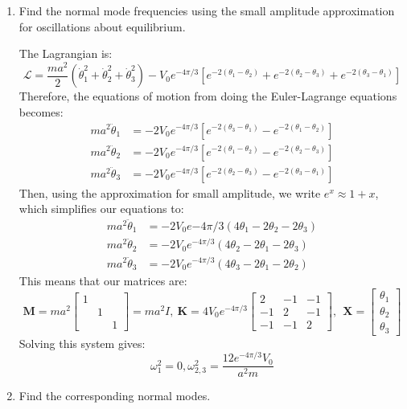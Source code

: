 \documentclass[10pt]{article}
\begin{document}
	\begin{enumerate}[label=\alph*)]
		\item Find the normal mode frequencies using the small amplitude approximation for oscillations about 
			equilibrium. 

			\begin{solution}
				The Lagrangian is: 
				\[
				\mathcal L = \frac{ma^2}{2}(\dot \theta_1^2 + \dot \theta_2^2 + \dot \theta_3^2) - 
				V_0e^{-4\pi/3}\left[e^{-2(\theta_1 - \theta_2)} + e^{-2(\theta_2 - \theta_3)} + e^{-2(\theta_3
				- \theta_1)}\right]
				\] 
				Therefore, the equations of motion from doing the Euler-Lagrange equations becomes: 
				\begin{align*}
					ma^2 \ddot \theta_1  &= -2V_0e^{-4\pi/3}\left[e^{-2(\theta_3 - \theta_1)} -
					e^{-2(\theta_1 - \theta_2)}\right] \\
					ma^2 \ddot \theta_2 &= -2V_0e^{-4\pi/3}\left[e^{-2(\theta_1 - \theta_2)} -
					e^{-2(\theta_2 - \theta_3)}\right] \\
					ma^2 \ddot \theta_3 &= -2V_0e^{-4\pi/3} \left[e^{-2(\theta_2 - \theta_3)} - 
					e^{-2(\theta_3 - \theta_1)}\right]
				\end{align*}
				Then, using the approximation for small amplitude, we write $e^x \approx 1 + x$, which simplifies
				our equations to: 
				\begin{align*}
					ma^2 \ddot \theta_1 &= -2V_0e{-4\pi/3}(4\theta_1 - 2\theta_2 - 2\theta_3)\\
					ma^2 \ddot \theta_2 &= -2V_0e^{-4\pi/3}(4 \theta_2 - 2\theta_1 - 2\theta_3)\\
					ma^2 \ddot \theta_3 &= -2V_0e^{-4\pi/3}(4\theta_3 - 2\theta_1 - 2\theta_2)
				\end{align*}
				This means that our matrices are: 
				\[
					\mathbf M = ma^2\begin{bmatrix} 1 & &\\ & 1 & \\ & & 1 \end{bmatrix} = ma^2I, \ 
					\mathbf K = 4V_0e^{-4\pi/3}\begin{bmatrix} 2 & -1 & -1\\-1&2&-1\\-1&-1&2 \end{bmatrix} , \ \
					\mathbf X = \begin{bmatrix} \theta_1 \\ \theta_2 \\ \theta_3 \end{bmatrix} 
				\] 
				Solving this system gives: 
				\[
					\omega_1^2 =0, \omega_{2, 3}^2 = \frac{12e^{-4\pi/3}V_0}{a^2m}
				\]
			\end{solution}
		\item Find the corresponding normal modes. 


\end{enumerate}
\end{document}
